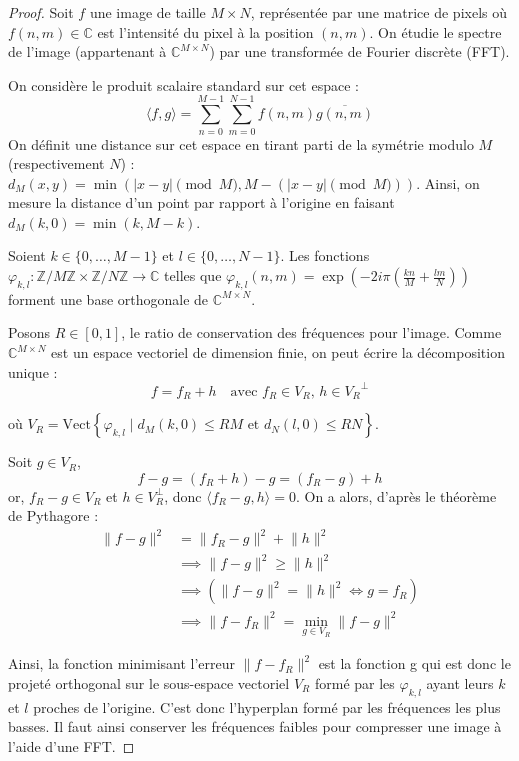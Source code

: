 \begin{proof}
    Soit $f$ une image de taille $M \times N$, représentée par une matrice de pixels où $f(n, m) \in \mathbb{C}$ est l'intensité du pixel à la position $(n, m)$. On étudie le spectre de l'image (appartenant à $\mathbb{C}^{M\times N}$) par une transformée de Fourier discrète (FFT).

    On considère le produit scalaire standard sur cet espace : 
    $$ 
    \langle f,g \rangle = \sum_{n=0}^{M-1}\sum_{m=0}^{N-1}f(n,m)\overline{g(n,m)}
    $$
    On définit une distance sur cet espace en tirant parti de la symétrie modulo $M$ (respectivement $N$) : $d_M(x, y) = \min(|x - y| \pmod M, M - (|x - y| \pmod M))$. Ainsi, on mesure la distance d'un point par rapport à l'origine en faisant $d_M(k,0)=\min(k,M-k)$.

    Soient $k \in \{0, \dots, M-1\}$ et $l \in \{0, \dots, N-1\}$. Les fonctions $\varphi_{k,l}: \mathbb{Z}/M\mathbb{Z} \times \mathbb{Z}/N\mathbb{Z} \to \mathbb{C}$ telles que $\varphi_{k,l}(n,m)=\exp\left(-2i\pi \left(\tfrac{kn}{M} + \tfrac{lm}{N}\right)\right)$ forment une base orthogonale de $\mathbb{C}^{M\times N}$.
    
    Posons $R \in [0,1]$, le ratio de conservation des fréquences pour l'image. Comme $\mathbb{C}^{M\times N}$ est un espace vectoriel de dimension finie, on peut écrire la décomposition unique :
    $$
    f = f_R + h \quad \text{avec } f_R \in V_R, \, h \in {V_R}^{\perp}
    $$
    
    où $V_R = \text{Vect} \left\{\varphi_{k,l} \mid d_M(k,0) \leq RM \text{ et } d_N(l,0) \leq RN\right\}$.

    Soit $g \in V_R$,
    $$
    f-g=(f_R+h)-g=(f_R-g)+h
    $$
    or, $f_R-g \in V_R$ et $h \in V_R^{\perp}$, donc $\langle f_R-g, h \rangle = 0$. On a alors, d'après le théorème de Pythagore : 
    \begin{align*}
        \lVert f-g \rVert^2 &= \lVert f_R-g \rVert^2 + \lVert h \rVert^2 \\
                            &\implies \lVert f-g \rVert^2 \geq \lVert h \rVert^2 \\
                            &\implies (\lVert f-g \rVert^2 = \lVert h \rVert^2 \iff g = f_R) \\
                            &\implies \lVert f-f_R \rVert^2 = \min_{g \in V_R} \lVert f-g \rVert^2
    \end{align*}

    Ainsi, la fonction minimisant l'erreur $\lVert f-f_R \rVert^2$ est la fonction g qui est donc le projeté orthogonal sur le sous-espace vectoriel $V_R$ formé par les $\varphi_{k,l}$ ayant leurs $k$ et $l$ proches de l'origine. C'est donc l'hyperplan formé par les fréquences les plus basses. Il faut ainsi conserver les fréquences faibles pour compresser une image à l'aide d'une FFT.
    
\end{proof}

